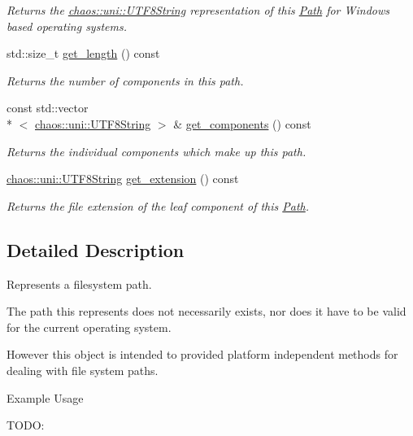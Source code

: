 \begin{DoxyCompactItemize}
\begin{DoxyCompactList}\small\item\em Returns the \hyperlink{classchaos_1_1uni_1_1_u_t_f8_string}{chaos\-::uni\-::\-U\-T\-F8\-String} representation of this \hyperlink{classchaos_1_1io_1_1sys_1_1_path}{Path} for Windows based operating systems. \end{DoxyCompactList}\item 
std\-::size\-\_\-t \hyperlink{classchaos_1_1io_1_1sys_1_1_path_aa3edecd81cd92a4fb16803bd9de9e7a4}{get\-\_\-length} () const 
\begin{DoxyCompactList}\small\item\em Returns the number of components in this path. \end{DoxyCompactList}\item 
const std\-::vector\\*
$<$ \hyperlink{classchaos_1_1uni_1_1_u_t_f8_string}{chaos\-::uni\-::\-U\-T\-F8\-String} $>$ \& \hyperlink{classchaos_1_1io_1_1sys_1_1_path_ae20cae838af510b945e716d529e19bf4}{get\-\_\-components} () const 
\begin{DoxyCompactList}\small\item\em Returns the individual components which make up this path. \end{DoxyCompactList}\item 
\hyperlink{classchaos_1_1uni_1_1_u_t_f8_string}{chaos\-::uni\-::\-U\-T\-F8\-String} \hyperlink{classchaos_1_1io_1_1sys_1_1_path_ac7a2b7c374c1e4059b021b2c8751fb39}{get\-\_\-extension} () const 
\begin{DoxyCompactList}\small\item\em Returns the file extension of the leaf component of this \hyperlink{classchaos_1_1io_1_1sys_1_1_path}{Path}. \end{DoxyCompactList}\end{DoxyCompactItemize}


\subsection{Detailed Description}
Represents a filesystem path. 

The path this represents does not necessarily exists, nor does it have to be valid for the current operating system.

However this object is intended to provided platform independent methods for dealing with file system paths.

\begin{DoxyParagraph}{Example Usage}

\end{DoxyParagraph}
T\-O\-D\-O\-: 

